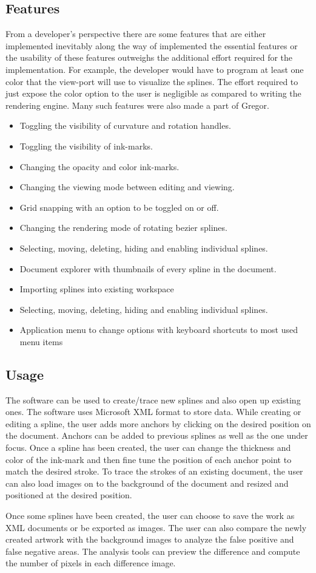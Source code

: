 \subsection{Features}
{
    From a developer's perspective there are some features that are either implemented inevitably along the way of implemented the essential features or the usability of these features outweighs the additional effort required for the implementation. For example, the developer would have to program at least one color that the view-port will use to visualize the splines. The effort required to just expose the color option to the user is negligible as compared to writing the rendering engine. Many such features were also made a part of Gregor.

    \begin{itemize}
    \item Toggling the visibility of curvature and rotation handles.
    \item Toggling the visibility of ink-marks.
    \item Changing the opacity and color ink-marks.
    \item Changing the viewing mode between editing and viewing.
    \item Grid snapping with an option to be toggled on or off.
    \item Changing the rendering mode of rotating bezier splines.
    \item Selecting, moving, deleting, hiding and enabling individual splines.
    \item Document explorer with thumbnails of every spline in the document.
    \item Importing splines into existing workspace
    \item Selecting, moving, deleting, hiding and enabling individual splines.
    \item Application menu to change options with keyboard shortcuts to most used menu items
    \end{itemize}
}
\subsection{Usage}
{
    The software can be used to create/trace new splines and also open up existing ones. The software uses Microsoft XML format to store data. While creating or editing a spline, the user adds more anchors by clicking on the desired position on the document. Anchors can be added to previous splines as well as the one under focus. Once a spline has been created, the user can change the thickness and color of the ink-mark and then fine tune the position of each anchor point to match the desired stroke. To trace the strokes of an existing document, the user can also load images on to the background of the document and resized and positioned at the desired position.

    Once some splines have been created, the user can choose to save the work as XML documents or be exported as images. The user can also compare the newly created artwork with the background images to analyze the false positive and false negative areas. The analysis tools can preview the difference and compute the number of pixels in each difference image.
}
